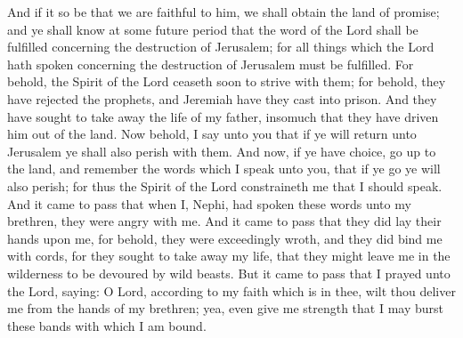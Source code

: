 And if it so be that we are faithful to him, we shall obtain the land of promise; and ye shall know at some future period that the word of the Lord shall be fulfilled concerning the destruction of Jerusalem; for all things which the Lord hath spoken concerning the destruction of Jerusalem must be fulfilled.
\bverse \iffalse For behold, the Spirit of the Lord ceaseth soon to strive with them; for behold, they have rejected the prophets, and Jeremiah have they cast into prison. And they have sought to take away the life of my father, insomuch that they have driven him out of the land. \fi
For behold, the Spirit of the Lord ceaseth soon to strive with them; for behold, they have rejected the prophets, and Jeremiah have they cast into prison. And they have sought to take away the life of my father, insomuch that they have driven him out of the land.
\bverse \iffalse Now behold, I say unto you that if ye will return unto Jerusalem ye shall also perish with them. And now, if ye have choice, go up to the land, and remember the words which I speak unto you, that if ye go ye will also perish; for thus the Spirit of the Lord constraineth me that I should speak. \fi
Now behold, I say unto you that if ye will return unto Jerusalem ye shall also perish with them. And now, if ye have choice, go up to the land, and remember the words which I speak unto you, that if ye go ye will also perish; for thus the Spirit of the Lord constraineth me that I should speak.
\bverse \iffalse And it came to pass that when I, Nephi, had spoken these words unto my brethren, they were angry with me. And it came to pass that they did lay their hands upon me, for behold, they were exceedingly wroth, and they did bind me with cords, for they sought to take away my life, that they might leave me in the wilderness to be devoured by wild beasts. \fi
And it came to pass that when I, Nephi, had spoken these words unto my brethren, they were angry with me. And it came to pass that they did lay their hands upon me, for behold, they were exceedingly wroth, and they did bind me with cords, for they sought to take away my life, that they might leave me in the wilderness to be devoured by wild beasts.
\bverse \iffalse But it came to pass that I prayed unto the Lord, saying: O Lord, according to my faith which is in thee, wilt thou deliver me from the hands of my brethren; yea, even give me strength that I may burst these bands with which I am bound. \fi
But it came to pass that I prayed unto the Lord, saying: O Lord, according to my faith which is in thee, wilt thou deliver me from the hands of my brethren; yea, even give me strength that I may burst these bands with which I am bound.
